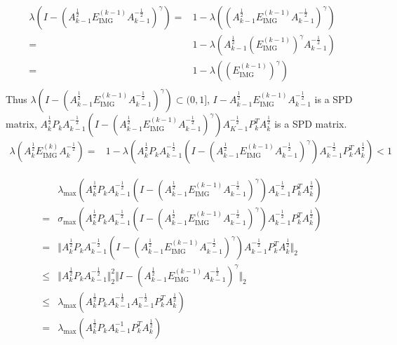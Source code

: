 \documentclass{article}
\begin{document}
\begin{equation*}
    \begin{aligned}
        \lambda(I-(A_{k-1}^{\frac{1}{2}}E_\text{IMG}^{(k-1)}A_{k-1}^{-\frac{1}{2}})^\gamma)= & 1-\lambda((A_{k-1}^{\frac{1}{2}}E_\text{IMG}^{(k-1)}A_{k-1}^{-\frac{1}{2}})^\gamma)  \\
        =                                                                                    & 1-\lambda(A_{k-1}^{\frac{1}{2}}(E_\text{IMG}^{(k-1)})^\gamma A_{k-1}^{-\frac{1}{2}}) \\
        =                                                                                    & 1-\lambda((E_\text{IMG}^{(k-1)})^\gamma )                                            \\
    \end{aligned}
\end{equation*}
Thus $ \lambda(I-(A_{k-1}^{\frac{1}{2}}E_\text{IMG}^{(k-1)}A_{k-1}^{-\frac{1}{2}})^\gamma)\subset (0,1]$, $I-A_{k-1}^{\frac{1}{2}}E_\text{IMG}^{(k-1)}A_{k-1}^{-\frac{1}{2}}$ is a SPD matrix, $A_k^{\frac{1}{2}}P_kA_{k-1}^{-\frac{1}{2}}(I-(A_{k-1}^{\frac{1}{2}}E_\text{IMG}^{(k-1)}A_{k-1}^{-\frac{1}{2}})^\gamma)A_{K-1}^{-\frac{1}{2}}P_k^TA_k^{\frac{1}{2}}$ is a SPD matrix.
\begin{equation*}
    \begin{aligned}
        \lambda(A_k^{\frac{1}{2}}E_\text{IMG}^{(k)}A_k^{-\frac{1}{2}})= & 1-\lambda(A_k^{\frac{1}{2}}P_kA_{k-1}^{-\frac{1}{2}}(I-(A_{k-1}^{\frac{1}{2}}E_\text{IMG}^{(k-1)}A_{k-1}^{-\frac{1}{2}})^\gamma)A_{k-1}^{-\frac{1}{2}}P_k^TA_k^{\frac{1}{2}}) <1
    \end{aligned}
\end{equation*}


\begin{equation*}
    \begin{aligned}
                  & \lambda_{\max} (A_k^{\frac{1}{2}}P_kA_{k-1}^{-\frac{1}{2}}(I-(A_{k-1}^{\frac{1}{2}}E_\text{IMG}^{(k-1)}A_{k-1}^{-\frac{1}{2}})^\gamma)A_{k-1}^{-\frac{1}{2}}P_k^TA_k^{\frac{1}{2}}) \\
        =         & \sigma_{\max} (A_k^{\frac{1}{2}}P_kA_{k-1}^{-\frac{1}{2}}(I-(A_{k-1}^{\frac{1}{2}}E_\text{IMG}^{(k-1)}A_{k-1}^{-\frac{1}{2}})^\gamma)A_{k-1}^{-\frac{1}{2}}P_k^TA_k^{\frac{1}{2}})  \\
        =         & \Vert A_k^{\frac{1}{2}}P_kA_{k-1}^{-\frac{1}{2}}(I-(A_{k-1}^{\frac{1}{2}}E_\text{IMG}^{(k-1)}A_{k-1}^{-\frac{1}{2}})^\gamma)A_{k-1}^{-\frac{1}{2}}P_k^TA_k^{\frac{1}{2}} \Vert_2    \\
        \leqslant & \Vert A_k^{\frac{1}{2}}P_kA_{k-1}^{-\frac{1}{2}}\Vert_2^2\Vert I-(A_{k-1}^{\frac{1}{2}}E_\text{IMG}^{(k-1)}A_{k-1}^{-\frac{1}{2}})^\gamma\Vert_2                                    \\
        \leqslant & \lambda_{\max}(A_k^{\frac{1}{2}}P_kA_{k-1}^{-\frac{1}{2}}A_{k-1}^{-\frac{1}{2}}P_k^TA_{k}^{\frac{1}{2}})                                                                            \\
        =         & \lambda_{\max}(A_k^{\frac{1}{2}}P_kA_{k-1}^{-1}P_k^TA_{k}^{\frac{1}{2}})
    \end{aligned}
\end{equation*}
\end{document}
